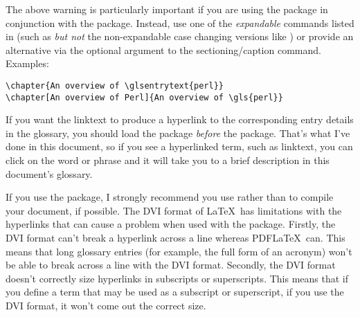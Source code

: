\documentclass[report,inlinetitle]{nlctdoc}
\begin{document}
The above warning is particularly important if you are using the
 package in conjunction with the 
package. Instead, use one of the \emph{expandable} commands listed in
 (such as  \emph{but
not} the non-expandable
case changing versions like ) or provide an
alternative via the optional argument to the sectioning\slash caption
command. Examples:
\begin{verbatim}
\chapter{An overview of \glsentrytext{perl}}
\chapter[An overview of Perl]{An overview of \gls{perl}}
\end{verbatim}

If you want the \gls{linktext} to produce a hyperlink to the
corresponding entry details in the glossary, you should load the
 package \emph{before} the 
package. That's what I've done in this document, so if you see a
hyperlinked term, such as \gls{linktext}, you can click on the word
or phrase and it will take you to a brief description in this
document's glossary.

\begin{important}
If you use the  package, I strongly recommend you use
 rather than  to compile your document, if
possible. The DVI format of \LaTeX\ has limitations with the
hyperlinks that can cause a problem when used with the
 package. Firstly, the DVI format can't break a
hyperlink across a line whereas PDF\LaTeX\ can. This means that long
glossary entries (for example, the full form of an acronym) won't be
able to break across a line with the DVI format. Secondly, the DVI
format doesn't correctly size hyperlinks in subscripts or
superscripts. This means that if you define a term that may be used
as a subscript or superscript, if you use the DVI format, it won't
come out the correct size.
\end{important}
\end{document}
